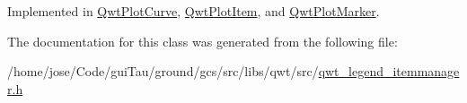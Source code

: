 Implemented in \hyperlink{class_qwt_plot_curve_aedbca95048e4c7b42cd0bf486ec36b4d}{Qwt\-Plot\-Curve}, \hyperlink{class_qwt_plot_item_a193770cd20609a368c5130de59cb782e}{Qwt\-Plot\-Item}, and \hyperlink{class_qwt_plot_marker_a75ea063a742c23ab1952fc2bf96b5762}{Qwt\-Plot\-Marker}.



The documentation for this class was generated from the following file\-:\begin{DoxyCompactItemize}
\item 
/home/jose/\-Code/gui\-Tau/ground/gcs/src/libs/qwt/src/\hyperlink{qwt__legend__itemmanager_8h}{qwt\-\_\-legend\-\_\-itemmanager.\-h}\end{DoxyCompactItemize}
